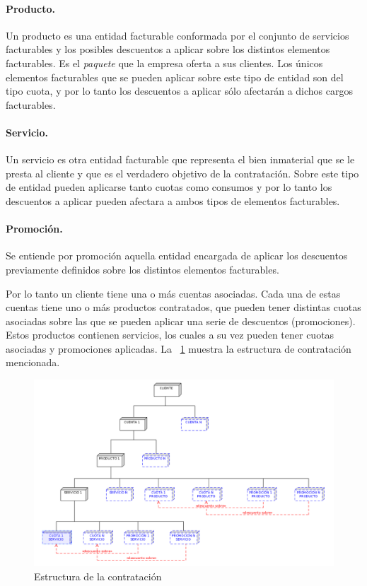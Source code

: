 \paragraph{Producto.} Un producto es una entidad facturable conformada por el conjunto de servicios facturables y los posibles descuentos a aplicar sobre los distintos elementos facturables. Es el \textit{paquete} que la empresa oferta a sus clientes. Los únicos elementos facturables que se pueden aplicar sobre este tipo de entidad son del tipo cuota, y por lo tanto los descuentos a aplicar sólo afectarán a dichos cargos facturables.

\paragraph{Servicio.} Un servicio es otra entidad facturable que representa el bien inmaterial que se le presta al cliente y que es el verdadero objetivo de la contratación. Sobre este tipo de entidad pueden aplicarse tanto cuotas como consumos  y por lo tanto los descuentos a aplicar pueden afectara a ambos tipos de elementos facturables.

\paragraph{Promoción.} Se entiende por promoción aquella entidad encargada de aplicar los descuentos previamente definidos sobre los distintos elementos facturables.


Por lo tanto un cliente tiene una o más cuentas asociadas. Cada una de estas cuentas tiene uno o más productos contratados, que pueden tener distintas cuotas asociadas sobre las que se pueden aplicar una serie de descuentos (promociones). Estos productos contienen servicios, los cuales a su vez pueden tener cuotas asociadas y promociones aplicadas. La \figurename~\ref{fig:estructura-contratacion-chap-teoria} muestra la estructura de contratación mencionada. 

\begin{figure}
  \centering
  \includegraphics[width=\textwidth]{imaxes/estructura-contratacion.png}
  \caption{Estructura de la contratación}
  \label{fig:estructura-contratacion-chap-teoria}
\end{figure}




